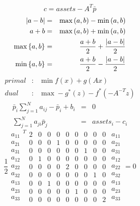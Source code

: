 \documentclass{article}
\begin{document}
\begin{equation*}
c=assets-A^{T}\bar{p}
\end{equation*}%
\begin{eqnarray*}
\left\vert a-b\right\vert  &=&\max \left( a,b\right) -\min \left( a,b\right) 
\\
a+b &=&\max \left( a,b\right) +\min \left( a,b\right)  \\
\max \left\{ a,b\right\}  &=&\frac{a+b}{2}+\frac{\left\vert a-b\right\vert }{%
2} \\
\min \left\{ a,b\right\}  &=&\frac{a+b}{2}-\frac{\left\vert a-b\right\vert }{%
2}
\end{eqnarray*}%
\begin{eqnarray*}
primal &:&\min f\left( x\right) +g\left( Ax\right)  \\
dual &:&\max -g^{\ast }\left( z\right) -f^{\ast }\left( -A^{-T}z\right) 
\end{eqnarray*}%
\begin{eqnarray*}
\bar{p}_{i}\sum_{j=1}^{N}a_{ij}-\bar{p}_{i}+b_{i} &=&0 \\
\sum_{j=1}^{N}a_{ji}\bar{p}_{j} &=&assets_{i}-c_{i}
\end{eqnarray*}%
\begin{equation*}
\frac{1}{2}%
\begin{array}{c}
a_{11} \\ 
a_{21} \\ 
a_{31} \\ 
a_{12} \\ 
a_{22} \\ 
a_{32} \\ 
a_{13} \\ 
a_{23} \\ 
a_{33}%
\end{array}%
^{T}%
\begin{array}{ccccccccc}
2 & 0 & 0 & 0 & 0 & 0 & 0 & 0 & 0 \\ 
0 & 0 & 0 & 1 & 0 & 0 & 0 & 0 & 0 \\ 
0 & 0 & 0 & 0 & 0 & 0 & 1 & 0 & 0 \\ 
0 & 1 & 0 & 0 & 0 & 0 & 0 & 0 & 0 \\ 
0 & 0 & 0 & 0 & 2 & 0 & 0 & 0 & 0 \\ 
0 & 0 & 0 & 0 & 0 & 0 & 0 & 1 & 0 \\ 
0 & 0 & 1 & 0 & 0 & 0 & 0 & 0 & 0 \\ 
0 & 0 & 0 & 0 & 0 & 1 & 0 & 0 & 0 \\ 
0 & 0 & 0 & 0 & 0 & 0 & 0 & 0 & 2%
\end{array}%
\begin{array}{c}
a_{11} \\ 
a_{21} \\ 
a_{31} \\ 
a_{12} \\ 
a_{22} \\ 
a_{32} \\ 
a_{13} \\ 
a_{23} \\ 
a_{33}%
\end{array}%
=0
\end{equation*}%
\end{document}
